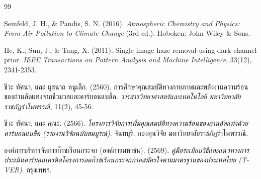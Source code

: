 \begin{thebibliography}{99}

Seinfeld, J. H., \& Pandis, S. N. (2016). \textit{Atmospheric Chemistry and Physics: From Air Pollution to Climate Change} (3rd ed.). Hoboken: John Wiley \& Sons.

He, K., Sun, J., \& Tang, X. (2011). Single image haze removal using dark channel prior. \textit{IEEE Transactions on Pattern Analysis and Machine Intelligence}, 33(12), 2341-2353.

ชีวะ ทัศนา, และ นุชนาถ หนูเล็ก. (2560). การศึกษาคุณสมบัติทางกายภาพและพลังงานความร้อนของถ่านอัดแท่งจากชีวมวลและคาร์บอนแบล็ค. \textit{วารสารวิทยาศาสตร์และเทคโนโลยี มหาวิทยาลัยราชภัฏรำไพพรรณี}, 11(2), 45-56.

ชีวะ ทัศนา, และ คณะ. (2566). \textit{โครงการวิจัยการเพิ่มคุณสมบัติทางความร้อนของถ่านอัดแท่งด้วยคาร์บอนแบล็ค (รายงานวิจัยฉบับสมบูรณ์)}. จันทบุรี: กองทุนวิจัย มหาวิทยาลัยราชภัฏรำไพพรรณี.

องค์การบริหารจัดการก๊าซเรือนกระจก (องค์การมหาชน). (2569). \textit{คู่มือระเบียบวิธีและแนวทางการประเมินคาร์บอนเครดิตโครงการลดก๊าซเรือนกระจกภาคสมัครใจตามมาตรฐานของประเทศไทย (T-VER)}. กรุงเทพฯ.

\end{thebibliography}
